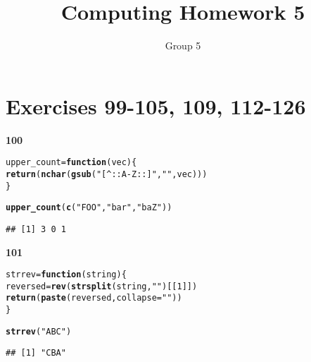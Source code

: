 \documentclass{article}\usepackage[]{graphicx}\usepackage[]{color}
\title{Computing Homework 5}
\author{Group 5}
\makeatletter
\newcommand{\hlnum}[1]{\textcolor[rgb]{0.686,0.059,0.569}{#1}}%
\newcommand{\hlstr}[1]{\textcolor[rgb]{0.192,0.494,0.8}{#1}}%
\newcommand{\hlstd}[1]{\textcolor[rgb]{0.345,0.345,0.345}{#1}}%
\newcommand{\hlkwa}[1]{\textcolor[rgb]{0.161,0.373,0.58}{\textbf{#1}}}%
\newcommand{\hlkwb}[1]{\textcolor[rgb]{0.69,0.353,0.396}{#1}}%
\newcommand{\hlkwc}[1]{\textcolor[rgb]{0.333,0.667,0.333}{#1}}%
\newcommand{\hlkwd}[1]{\textcolor[rgb]{0.737,0.353,0.396}{\textbf{#1}}}%
\newenvironment{kframe}{%
 \def\at@end@of@kframe{}%
 \ifinner\ifhmode%
  \def\at@end@of@kframe{\end{minipage}}%
  \begin{minipage}{\columnwidth}%
 \fi\fi%
 \def\FrameCommand##1{\hskip\@totalleftmargin \hskip-\fboxsep
 \colorbox{shadecolor}{##1}\hskip-\fboxsep
     \hskip-\linewidth \hskip-\@totalleftmargin \hskip\columnwidth}%
 \MakeFramed {\advance\hsize-\width
   \@totalleftmargin\z@ \linewidth\hsize
   \@setminipage}}%
 {\par\unskip\endMakeFramed%
 \at@end@of@kframe}
\newenvironment{knitrout}{}{} %
\makeatother
\begin{document}
\maketitle
\date{}

\section{Exercises 99-105, 109, 112-126}




\textbf{100}
\begin{knitrout}
\color{fgcolor}\begin{kframe}
\begin{alltt}
\hlstd{upper_count} \hlkwb{=} \hlkwa{function}\hlstd{(}\hlkwc{vec}\hlstd{) \{}
  \hlkwd{return}\hlstd{(}\hlkwd{nchar}\hlstd{(}\hlkwd{gsub}\hlstd{(}\hlstr{"[^::A-Z::]"}\hlstd{,}\hlstr{""}\hlstd{, vec)))}
\hlstd{\}}

\hlkwd{upper_count}\hlstd{(}\hlkwd{c}\hlstd{(}\hlstr{"FOO"}\hlstd{,} \hlstr{"bar"}\hlstd{,} \hlstr{"baZ"}\hlstd{))}
\end{alltt}
\begin{verbatim}
## [1] 3 0 1
\end{verbatim}
\end{kframe}
\end{knitrout}


\textbf{101}
\begin{knitrout}
\color{fgcolor}\begin{kframe}
\begin{alltt}
\hlstd{strrev} \hlkwb{=} \hlkwa{function}\hlstd{(}\hlkwc{string}\hlstd{) \{}
  \hlstd{reversed} \hlkwb{=} \hlkwd{rev}\hlstd{(}\hlkwd{strsplit}\hlstd{(string,} \hlstr{""}\hlstd{)[[}\hlnum{1}\hlstd{]])}
  \hlkwd{return}\hlstd{(}\hlkwd{paste}\hlstd{(reversed,} \hlkwc{collapse} \hlstd{=} \hlstr{""}\hlstd{))}
\hlstd{\}}

\hlkwd{strrev}\hlstd{(}\hlstr{"ABC"}\hlstd{)}
\end{alltt}
\begin{verbatim}
## [1] "CBA"
\end{verbatim}
\end{kframe}
\end{knitrout}
\end{document}
